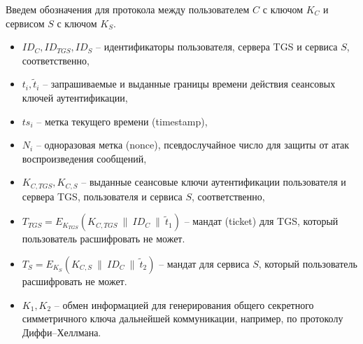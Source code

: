 Введем обозначения для протокола между пользователем $C$ с ключом $K_C$ и сервисом $S$ с ключом $K_S$.
\begin{itemize}
    \item $ID_C, ID_{TGS}, ID_S$ -- идентификаторы пользователя, сервера TGS и сервиса $S$, соответственно,
    \item $t_i, \tilde{t}_i$ -- запрашиваемые и выданные границы времени действия сеансовых ключей аутентификации,
    \item $ts_i$ -- метка текущего времени (timestamp),
    \item $N_i$ -- одноразовая метка (nonce), псевдослучайное число для защиты от атак воспроизведения сообщений,
    \item $K_{C,TGS}, K_{C,S}$ -- выданные сеансовые ключи аутентификации пользователя и сервера TGS, пользователя и сервиса $S$, соответственно,
    \item $T_{TGS} = E_{K_{TGS}}(K_{C,TGS} ~\|~ ID_C ~\|~ \tilde{t}_1)$ -- мандат (ticket) для TGS, который пользователь расшифровать не может.
    \item $T_{S} = E_{K_S}(K_{C,S} ~\|~ ID_C ~\|~ \tilde{t}_2)$ -- мандат для сервиса $S$, который пользователь расшифровать не может.
    \item $K_1, K_2$ -- обмен информацией для генерирования общего секретного симметричного ключа дальнейшей коммуникации, например, по протоколу Диффи--Хеллмана.
\end{itemize}

